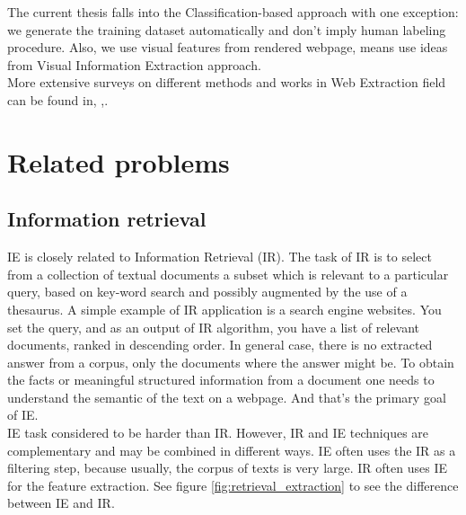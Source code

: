 The current thesis falls into the Classification-based approach with one exception: we generate the training dataset automatically and don't imply human labeling procedure. Also, we use visual features from rendered webpage, means use ideas from Visual Information Extraction approach.\\  

More extensive surveys on different methods and works in Web Extraction field can be found in\cite{WebExtraSurveyFerrara}, \cite{Trends},\cite{WebDataSurvey}.

\section{Related problems}

\subsection{Information retrieval}

IE is closely related to Information Retrieval (IR). The task of IR is to select from a collection of textual documents a subset which is relevant to a particular query, based on key-word search and possibly augmented by the use of a thesaurus\cite{InfExtr}. A simple example of IR application is a search engine websites. You set the query, and as an output of IR algorithm, you have a list of relevant documents, ranked in descending order. In general case, there is no extracted answer from a corpus, only the documents where the answer might be. To obtain the facts or meaningful structured information from a document one needs to understand the semantic of the text on a webpage. And that's the primary goal of IE.\\

IE task considered to be harder than IR. However, IR and IE techniques are complementary and may be combined in different ways. IE often uses the IR as a filtering step, because usually, the corpus of texts is very large. IR often uses IE for the feature extraction. See figure \ref{fig:retrieval_extraction} to see the difference between IE and IR.\\

